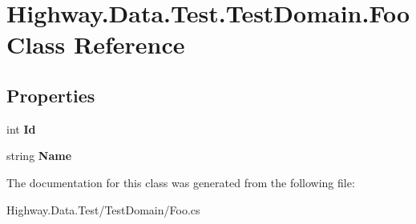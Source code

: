 \hypertarget{class_highway_1_1_data_1_1_test_1_1_test_domain_1_1_foo}{\section{Highway.\-Data.\-Test.\-Test\-Domain.\-Foo Class Reference}
\label{class_highway_1_1_data_1_1_test_1_1_test_domain_1_1_foo}
}
\subsection*{Properties}
\begin{DoxyCompactItemize}
\item 
\hypertarget{class_highway_1_1_data_1_1_test_1_1_test_domain_1_1_foo_aef96842e4c2ed9d18dd1f661c6e630df}{int {\bfseries Id}}\label{class_highway_1_1_data_1_1_test_1_1_test_domain_1_1_foo_aef96842e4c2ed9d18dd1f661c6e630df}

\item 
\hypertarget{class_highway_1_1_data_1_1_test_1_1_test_domain_1_1_foo_a5c28809a8e5d60ad998dc465f5d0b499}{string {\bfseries Name}}\label{class_highway_1_1_data_1_1_test_1_1_test_domain_1_1_foo_a5c28809a8e5d60ad998dc465f5d0b499}

\end{DoxyCompactItemize}


The documentation for this class was generated from the following file\-:\begin{DoxyCompactItemize}
\item 
Highway.\-Data.\-Test/\-Test\-Domain/Foo.\-cs\end{DoxyCompactItemize}
